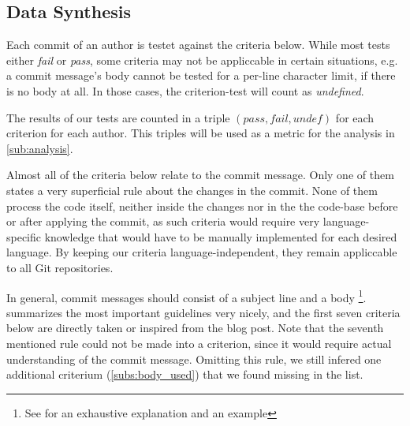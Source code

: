 

\subsection{Data Synthesis}

%
%
%
%
%
%


Each commit of an author is testet against the criteria below. While most tests either \emph{fail} or \emph{pass}, some criteria may not be appliccable in certain situations, e.g. a commit message's body cannot be tested for a per-line character limit, if there is no body at all. In those cases, the criterion-test will count as \emph{undefined}.

The results of our tests are counted in a triple $(pass, fail, undef)$ for each criterion for each author. This triples will be used as a metric for the analysis in \ref{sub:analysis}.

Almost all of the criteria below relate to the commit message. Only one of them states a very superficial rule about the changes in the commit. None of them process the code itself, neither inside the changes nor in the the code-base before or after applying the commit, as such criteria would require very language-specific knowledge that would have to be manually implemented for each desired language. By keeping our criteria language-independent, they remain appliccable to all Git repositories.

In general, commit messages should consist of a subject line and a body \footnote{See \cite{OffGuide} for an exhaustive explanation and an example}. \cite{CB} summarizes the most important guidelines very nicely, and the first seven criteria below are directly taken or inspired from the blog post. Note that the seventh mentioned rule could not be made into a criterion, since it would require actual understanding of the commit message. Omitting this rule, we still infered one additional criterium (\ref{subs:body_used}) that we found missing in the list.

